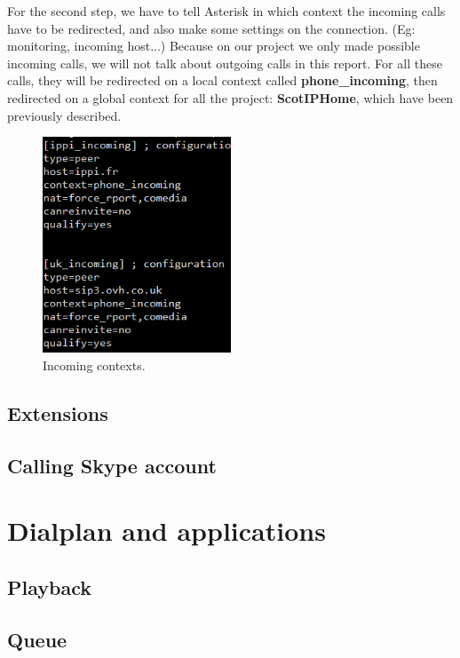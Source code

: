 For the second step, we have to tell Asterisk in which context the incoming calls have to be redirected, and also make some settings on the connection. (Eg: monitoring, incoming host...)
Because on our project we only made possible incoming calls, we will not talk about outgoing calls in this report. For all these calls, they will be redirected on a local context called \textbf{phone\_incoming}, then redirected on a global context for all the project: \textbf{ScotIPHome}, which have been previously described.

\begin{figure}[!ht]
  \caption{Incoming contexts.}
  \centering
    \includegraphics[width=0.5\textwidth]{img/contextsphones.png}
\end{figure}

\subsection{Extensions}


\subsection{Calling Skype account}


\section{Dialplan and applications}

\subsection{Playback}
\subsection{Queue}
